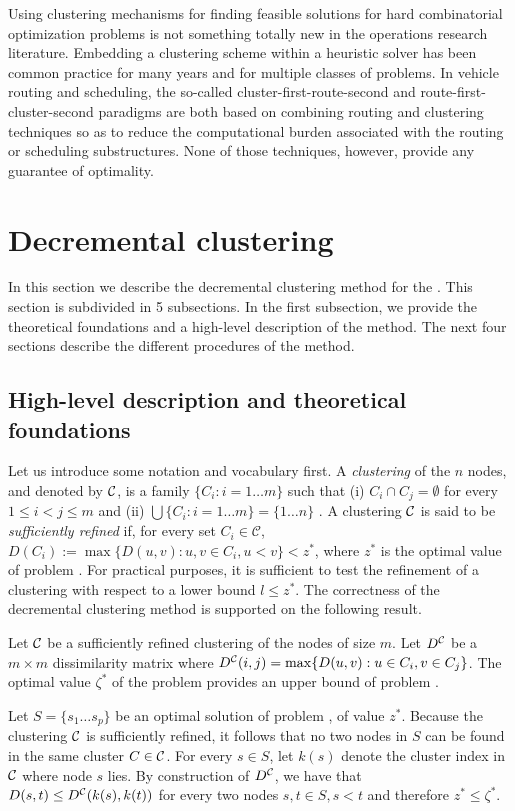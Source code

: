 \documentclass[ijoo,nonblindrev]{informs-ijoo}
\begin{document}
Using clustering mechanisms for finding feasible solutions for hard combinatorial optimization problems is not something totally new in the operations research literature. Embedding a clustering scheme within a heuristic solver has been common practice for many years and for multiple classes of problems. In vehicle routing and scheduling, the so-called cluster-first-route-second \citep{Solomon1987algorithms, Braysy2005Vehicle} and route-first-cluster-second \citep{Beasley1983route, Prins2014Order} paradigms are both based on combining routing and clustering techniques so as to reduce the computational burden associated with the routing or scheduling substructures. None of those techniques, however, provide any guarantee of optimality.

\section{Decremental clustering\label{section:decrclust}}

In this section we describe the decremental clustering method for the \pDP{}. This section is subdivided in 5 subsections. In the first subsection, we provide the theoretical foundations and a high-level description of the method. The next four sections describe the different procedures of the method.

\subsection{High-level description and theoretical foundations}

Let us introduce some notation and vocabulary first. A \textit{clustering} of the $n$ nodes, and denoted by $\mathcal{C}$, is a family $\{C_i: i = 1 \ldots m\}$ such that (i) $C_i\cap C_j =\emptyset$ for every $1\leq i < j\leq m$ and (ii) $\bigcup\{C_i: i=1\ldots m\} = \{1\ldots n\}$ . A clustering $\mathcal{C}$ is said to be \textit{sufficiently refined} if, for every set $C_i\in\mathcal{C}$, $D(C_i) := \max\{D(u, v): u, v\in C_i, u < v\} < z^*$, where $z^*$ is the optimal value of problem . For practical purposes, it is sufficient to test the refinement of a clustering with respect to a lower bound $l \leq z^*$. The correctness of the decremental clustering method is supported on the following result.

\begin{lemma}\label{proposition:lemma1}
	Let $\mathcal{C}$ be a sufficiently refined clustering of the nodes of size $m$. Let $D^{\mathcal{C}}$ be a $m\times m$ dissimilarity matrix where $D^{\mathcal{C}}(i, j) = \max\{D(u, v): u\in C_i, v\in C_j\}$. The optimal value $\zeta^*$ of the problem  provides an upper bound of problem .
\end{lemma}
	Let $S = \{s_1\ldots s_p\}$ be an optimal solution of problem , of value $z^*$. Because the clustering $\mathcal{C}$ is sufficiently refined, it follows that no two nodes in $S$ can be found in the same cluster $C\in\mathcal{C}$. For every $s\in S$, let $k(s)$ denote the cluster index in $\mathcal{C}$ where node $s$ lies. By construction of $D^{\mathcal{C}}$, we have that $D(s, t)\leq D^{\mathcal{C}}(k(s), k(t))$ for every two nodes $s, t\in S, s < t$ and therefore $z^* \leq \zeta^*$.\Halmos
\endproof
\end{document}

